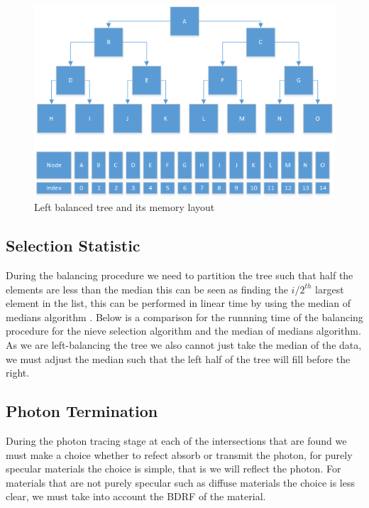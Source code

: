 \begin{figure}
\centering
\includegraphics[scale=0.75]{./implementation/left-balanced-tree.png}
\caption{Left balanced tree and its memory layout}
\end{figure}

\subsection{Selection Statistic}
During the balancing procedure we need to partition the tree such that half the elements are less than the median
this can be seen as finding the $i/2^{th}$ largest element in the list, this can be performed in linear time by using
the median of medians algorithm . Below is a comparison for the runnning time of the balancing procedure for
the nieve selection algorithm and the median of medians algorithm. As we are left-balancing the tree we also cannot
just take the median of the data, we must adjust the median such that the left half of the tree will fill before the right.


\subsection{Photon Termination}
During the photon tracing stage at each of the intersections that are found we must make a choice whether to refect absorb or transmit
the photon, for purely specular materials the choice is simple, that is we will reflect the photon. For materials that are not purely
specular such as diffuse materials the choice is less clear, we must take into account the BDRF of the material.
